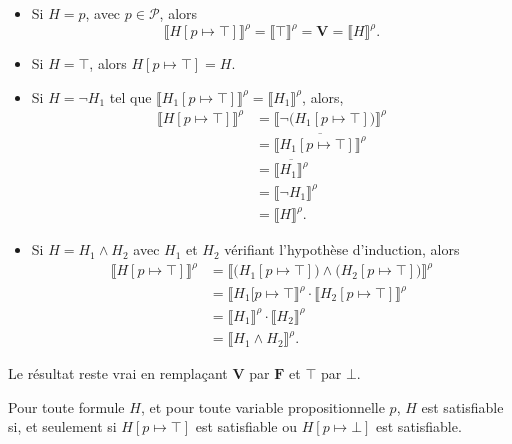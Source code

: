 \begin{prv}
	\begin{itemize}
		\item Si $H = p$, avec $p \in \mathcal{P}$, alors \[
				{\Big\llbracket H[p \mapsto \top] \Big\rrbracket^\rho} = \llbracket \top \rrbracket^\rho = \mathbf{V} = \llbracket H \rrbracket^\rho.
			\]
		\item Si $H = \top$, alors $H[p \mapsto \top] = H$.
		\item Si $H = \lnot H_1$\/ tel que $\Big\llbracket H_1[p\mapsto \top] \Big\rrbracket^\rho = \llbracket H_1 \rrbracket^\rho$, alors,
			\begin{align*}
				\Big\llbracket H[p \mapsto \top] \Big\rrbracket^\rho &= \Big\llbracket \lnot \big(H_1[p\mapsto \top]\big) \Big\rrbracket^\rho \\
				&= \overline{\Big\llbracket H_1[p\mapsto \top] \Big\rrbracket^\rho} \\
				&= \overline{\llbracket H_1 \rrbracket^\rho} \\
				&= \llbracket \lnot H_1 \rrbracket^\rho \\
				&= \llbracket H \rrbracket^\rho.
			\end{align*}
		\item Si $H = H_1 \land H_2$\/ avec $H_1$\/ et $H_2$\/ vérifiant l'hypothèse d'induction, alors
			\begin{align*}
				\Big\llbracket H[p\mapsto \top ] \Big\rrbracket^\rho &=
				\Big\llbracket \big(H_1[p \mapsto \top]\big) \land \big(H_2[p \mapsto \top]\big) \Big\rrbracket^\rho\\
				&= \Big\llbracket H_1[p\mapsto \top \Big\rrbracket^\rho \cdot \Big\llbracket H_2[p\mapsto \top] \Big\rrbracket^\rho  \\
				&= \llbracket H_1 \rrbracket^\rho \cdot \llbracket H_2 \rrbracket^\rho \\
				&= \llbracket H_1 \land H_2 \rrbracket^\rho.
			\end{align*}
	\end{itemize}
\end{prv}

\begin{rmk}
	Le résultat reste vrai en remplaçant $\mathbf{V}$\/ par $\mathbf{F}$\/ et $\top$\/ par $\bot$.
\end{rmk}

\begin{lem}
	Pour toute formule $H$, et pour toute variable propositionnelle $p$, $H$\/ est satisfiable si, et seulement si $H[p\mapsto \top]$\/ est satisfiable ou $H[p\mapsto \bot]$\/ est satisfiable.
\end{lem}

